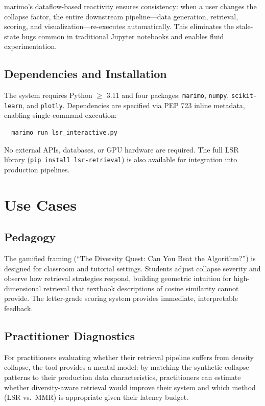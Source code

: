 \documentclass[11pt]{article}
\begin{document}
marimo's dataflow-based reactivity ensures consistency: when a user changes the collapse factor, the entire downstream pipeline---data generation, retrieval, scoring, and visualization---re-executes automatically. This eliminates the stale-state bugs common in traditional Jupyter notebooks and enables fluid experimentation.

\subsection{Dependencies and Installation}

The system requires Python $\geq$ 3.11 and four packages: \texttt{marimo}, \texttt{numpy}, \texttt{scikit-learn}, and \texttt{plotly}. Dependencies are specified via PEP 723 inline metadata, enabling single-command execution:

\begin{verbatim}
  marimo run lsr_interactive.py
\end{verbatim}

No external APIs, databases, or GPU hardware are required. The full LSR library (\texttt{pip install lsr-retrieval}) is also available for integration into production pipelines.

\section{Use Cases}

\subsection{Pedagogy}
The gamified framing (``The Diversity Quest: Can You Beat the Algorithm?'') is designed for classroom and tutorial settings. Students adjust collapse severity and observe how retrieval strategies respond, building geometric intuition for high-dimensional retrieval that textbook descriptions of cosine similarity cannot provide. The letter-grade scoring system provides immediate, interpretable feedback.

\subsection{Practitioner Diagnostics}
For practitioners evaluating whether their retrieval pipeline suffers from density collapse, the tool provides a mental model: by matching the synthetic collapse patterns to their production data characteristics, practitioners can estimate whether diversity-aware retrieval would improve their system and which method (LSR vs.\ MMR) is appropriate given their latency budget.
\end{document}
